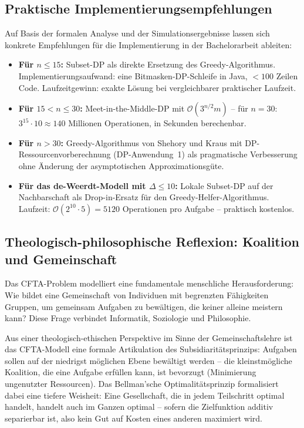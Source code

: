 \documentclass[a4paper,12pt]{article}
\theoremstyle{definition}
\begin{document}
\subsection{Praktische Implementierungsempfehlungen}

Auf Basis der formalen Analyse und der Simulationsergebnisse lassen sich
konkrete Empfehlungen f\"{u}r die Implementierung in der Bachelorarbeit \cite{epp2026}
ableiten:

\begin{itemize}
    \item \textbf{F\"{u}r $n \leq 15$:} Subset-DP als direkte Ersetzung des
          Greedy-Algorithmus. Implementierungsaufwand: eine Bitmasken-DP-Schleife
          in Java, $< 100$ Zeilen Code. Laufzeitgewinn: exakte L\"{o}sung bei
          vergleichbarer praktischer Laufzeit.
    \item \textbf{F\"{u}r $15 < n \leq 30$:} Meet-in-the-Middle-DP mit
          $\mathcal{O}(3^{n/2} m)$ -- f\"{u}r $n = 30$: $3^{15} \cdot 10 \approx 140$
          Millionen Operationen, in Sekunden berechenbar.
    \item \textbf{F\"{u}r $n > 30$:} Greedy-Algorithmus von Shehory und Kraus
          mit DP-Ressourcenvorberechnung (DP-Anwendung~1) als pragmatische
          Verbesserung ohne \"{A}nderung der asymptotischen Approximationsg\"{u}te.
    \item \textbf{F\"{u}r das de-Weerdt-Modell mit $\Delta \leq 10$:}
          Lokale Subset-DP auf der Nachbarschaft als Drop-in-Ersatz f\"{u}r
          den Greedy-Helfer-Algorithmus. Laufzeit: $\mathcal{O}(2^{10} \cdot 5) = 5120$
          Operationen pro Aufgabe -- praktisch kostenlos.
\end{itemize}

\subsection{Theologisch-philosophische Reflexion: Koalition und Gemeinschaft}

Das CFTA-Problem modelliert eine fundamentale menschliche Herausforderung:
Wie bildet eine Gemeinschaft von Individuen mit begrenzten F\"{a}higkeiten
Gruppen, um gemeinsam Aufgaben zu bew\"{a}ltigen, die keiner alleine
meistern kann? Diese Frage verbindet Informatik, Soziologie und Philosophie.

Aus einer theologisch-ethischen Perspektive im Sinne der Gemeinschaftslehre
ist das CFTA-Modell eine formale Artikulation des Subsidiarit\"{a}tsprinzips:
Aufgaben sollen auf der niedrigst m\"{o}glichen Ebene bew\"{a}ltigt werden --
die kleinstm\"{o}gliche Koalition, die eine Aufgabe erf\"{u}llen kann, ist
bevorzugt (Minimierung ungenutzter Ressourcen). Das Bellman'sche
Optimalit\"{a}tsprinzip formalisiert dabei eine tiefere Weisheit: Eine Gesellschaft,
die in jedem Teilschritt optimal handelt, handelt auch im Ganzen optimal --
sofern die Zielfunktion additiv separierbar ist, also kein Gut auf Kosten
eines anderen maximiert wird.
\end{document}
